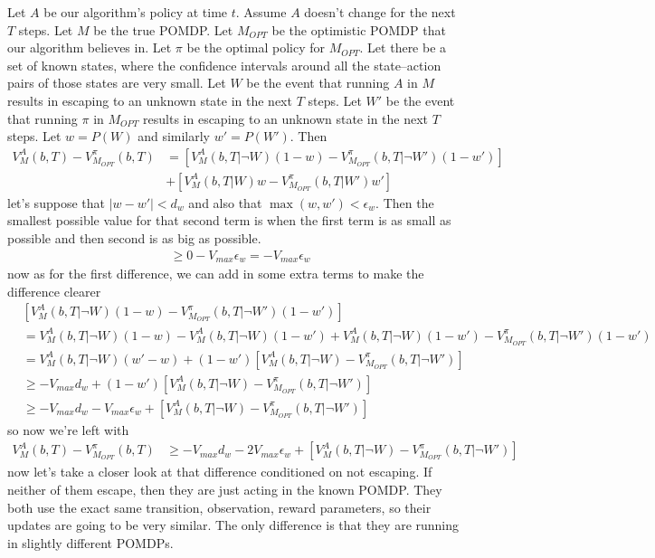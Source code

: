 \documentclass[10pt,english]{article}
\begin{document}
Let $A$ be our algorithm's policy at time $t$. Assume $A$ doesn't change for the next $T$ steps. Let $M$ be the true POMDP. Let $M_{OPT}$ be the optimistic POMDP that our algorithm believes in. Let $\pi$ be the optimal policy for $M_{OPT}$. Let there be a set of known states, where the confidence intervals around all the state--action pairs of those states are very small. Let $W$ be the event that running $A$ in $M$ results in escaping to an unknown state in the next $T$ steps. Let $W'$ be the event that running $\pi$ in $M_{OPT}$ results in escaping to an unknown state in the next $T$ steps. Let $w=P(W)$ and similarly $w'=P(W')$. Then
\begin{align}
V^A_M(b,T) - V^{\pi}_{M_{OPT}}(b,T) &= [V^A_M(b,T|\neg W)(1-w) - V^{\pi}_{M_{OPT}}(b,T|\neg W')(1-w')] \\
& + [V^A_M(b,T|W)w - V^{\pi}_{M_{OPT}}(b,T|W')w']
\end{align}
let's suppose that $|w-w'|<d_w$ and also that $\max(w,w')<\epsilon_w$. Then the smallest possible value for that second term is when the first term is as small as possible and then second is as big as possible.
\begin{align}
[V^A_M(b,T|W)w - V^{\pi}_{M_{OPT}}(b,T|W')w'] &\geq 0 - V_{max}\epsilon_w = -V_{max}\epsilon_w
\end{align}
now as for the first difference, we can add in some extra terms to make the difference clearer
\begin{align}
 & [V^A_M(b,T|\neg W)(1-w) - V^{\pi}_{M_{OPT}}(b,T|\neg W')(1-w')] \\
 &= V^A_M(b,T|\neg W)(1-w) - V^A_M(b,T|\neg W)(1-w') + V^A_M(b,T|\neg W)(1-w') - V^{\pi}_{M_{OPT}}(b,T|\neg W')(1-w') \\
 &= V^A_M(b,T|\neg W)(w'-w) + (1-w')[V^A_M(b,T|\neg W) - V^{\pi}_{M_{OPT}}(b,T|\neg W')] \\
&\geq -V_{max}d_w + (1-w')[V^A_M(b,T|\neg W) - V^{\pi}_{M_{OPT}}(b,T|\neg W')] \\
&\geq -V_{max}d_w - V_{max}\epsilon_w + [V^A_M(b,T|\neg W) - V^{\pi}_{M_{OPT}}(b,T|\neg W')]
\end{align}
so now we're left with
\begin{align}
V^A_M(b,T) - V^{\pi}_{M_{OPT}}(b,T) &\geq -V_{max}d_w -2V_{max}\epsilon_w + [V^A_M(b,T|\neg W) - V^{\pi}_{M_{OPT}}(b,T|\neg W')]
\end{align}
now let's take a closer look at that difference conditioned on not escaping. If neither of them escape, then they are just acting in the known POMDP. They both use the exact same transition, observation, reward parameters, so their updates are going to be very similar. The only difference is that they are running in slightly different POMDPs.
\end{document}
